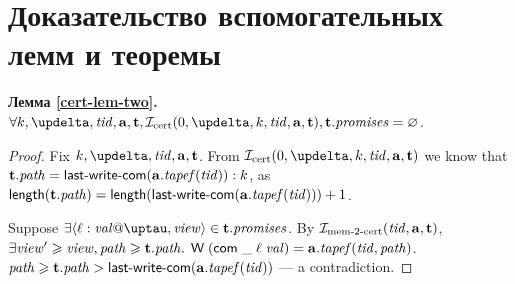 \section{Доказательство вспомогательных лемм и теоремы}

\noindent
{\bf Лемма \ref{cert-lem-two}.}
$\forall k, \delta, \tId, \aT, \tT, \invCert(0, \delta, k, \tId, \aT, \tT), \tT.\PromSet = \emptyset$.
\begin{proof}%
  Fix $k, \delta, \tId, \aT, \tT$. From $\invCert(0, \delta, k, \tId, \aT, \tT)$ we know that
  $\tT.\cpath = \lastCommittedWrite(\aT.\tapef(\tId)):k$, as
  $\length(\tT.\cpath) = \length(\lastCommittedWrite(\aT.\tapef(\tId))) + 1$.
  
  Suppose $\exists \writeEvt{\loc}{\stval}{\tau}{\R} \in \tT.\PromSet$. By $\mathcal{I}_{\textup{\rm mem-2-cert}}(\mathit{tid}, \mathbf{a}, \mathbf{t})$,
  $\exists \mathit{view}' \geqslant \mathit{view}, \mathit{path} \geqslant \mathbf{t}.\mathit{path}.$
  $\textsf{W} \; (\mathsf{com} \; \_ \; \ell \; \mathit{val}) = \mathbf{a}.\mathit{tapef}(\mathit{tid}, \mathit{path})$.
  $\mathit{path} \geqslant \mathbf{t}.\mathit{path} > \textup{\sf last-write-com}(\mathbf{a}.\mathit{tapef}(\mathit{tid}))$ --- a contradiction.
\end{proof}

